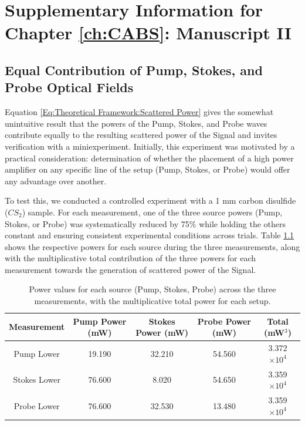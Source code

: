 \doublespacing
\chapter{Supplementary Information for Chapter \ref{ch:CABS}: Manuscript II}
\label{appendix: CABS}
\acresetall

\section{Equal Contribution of Pump, Stokes, and Probe Optical Fields}

Equation \ref{Eq:Theoretical Framework:Scattered Power} gives the somewhat unintuitive result that the powers of the Pump, Stokes, and Probe waves contribute equally to the resulting scattered power of the Signal and invites verification with a miniexperiment. Initially, this experiment was motivated by a practical consideration: determination of whether the placement of a high power amplifier on any specific line of the setup (Pump, Stokes, or Probe) would offer any advantage over another.

To test this, we conducted a controlled experiment with a 1 mm carbon disulfide ($CS_{2}$) sample. For each measurement, one of the three source powers (Pump, Stokes, or Probe) was systematically reduced by 75\% while holding the others constant and ensuring consistent experimental conditions across trials. Table \ref{tab:PSPr-Contribute-Equally} shows the respective powers for each source during the three measurements, along with the multiplicative total contribution of the three powers for each measurement towards the generation of scattered power of the Signal.

\begin{table}[h]
  \centering
  \renewcommand{\arraystretch}{1.2}
  \begin{tabular}{|c|c|c|c|c|}
    \hline
    \textbf{Measurement} & \textbf{Pump Power (mW)} & \textbf{Stokes Power (mW)} & \textbf{Probe Power (mW)} & \textbf{Total (mW$^{3}$)} \\
    \hline
    Pump Lower & 19.190 & 32.210 & 54.560 & 3.372 $\times 10^{4}$ \\
    Stokes Lower & 76.600 & 8.020 & 54.650 & 3.359 $\times 10^{4}$ \\
    Probe Lower & 76.600 & 32.530 & 13.480 & 3.359 $\times 10^{4}$ \\
    \hline
  \end{tabular}
    \caption{Power values for each source (Pump, Stokes, Probe) across the three measurements, with the multiplicative total power for each setup.}
    \label{tab:PSPr-Contribute-Equally}
\end{table}

